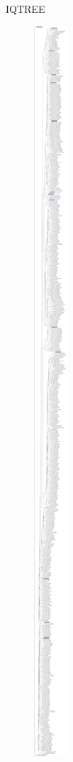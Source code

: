 \documentclass{beamer}
\begin{document}
\begin{frame}[t]{IQTREE} 
\vspace{4pt}
\begin{figure}
\includegraphics[scale=0.7]{MS95_PRRT_20M_highlighted.treefile.pdf}
\end{figure}
\end{frame}
\end{document}
